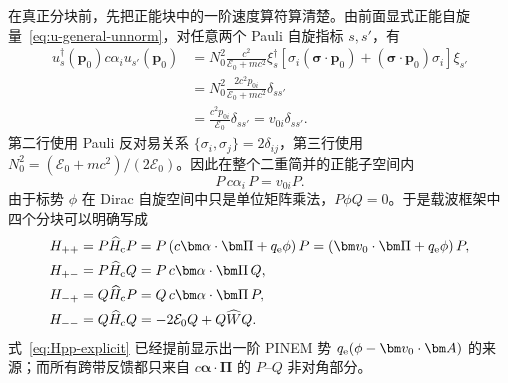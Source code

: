 在真正分块前，先把正能块中的一阶速度算符算清楚。由前面显式正能自旋量~\eqref{eq:u-general-unnorm}，对任意两个 Pauli 自旋指标 $s,s'$，有
\begin{align}
 u_s^\dagger(\bm p_0)c\alpha_i u_{s'}(\bm p_0)
 &=N_0^2\frac{c^2}{\mathcal E_0+mc^2}
 \xi_s^\dagger
 \left[\sigma_i(\bm\sigma\cdot\bm p_0)
 +(\bm\sigma\cdot\bm p_0)\sigma_i\right]\xi_{s'}\\
 &=N_0^2\frac{2c^2p_{0i}}{\mathcal E_0+mc^2}
 \delta_{ss'}\\
 &=\frac{c^2p_{0i}}{\mathcal E_0}\delta_{ss'}
 =v_{0i}\delta_{ss'}.
\label{eq:projected-alpha-velocity-explicit}
\end{align}
第二行使用 Pauli 反对易关系
$\{\sigma_i,\sigma_j\}=2\delta_{ij}$，第三行使用
$N_0^2=(\mathcal E_0+mc^2)/(2\mathcal E_0)$。因此在整个二重简并的正能子空间内
\begin{equation}
\boxed{P\,c\alpha_i\,P=v_{0i}P.}
\label{eq:projected-alpha-velocity}
\end{equation}
由于标势 $\phi$ 在 Dirac 自旋空间中只是单位矩阵乘法，$P\phi Q=0$。于是载波框架中四个分块可以明确写成
\begin{align}
H_{++}&=P\widehat H_{\rm c}P
=P\left(c\bm\alpha\cdot\bm\Pi+q_{\rm e}\phi\right)P
=\left(\bm v_0\cdot\bm\Pi+q_{\rm e}\phi\right)P,
\label{eq:Hpp-explicit}\\
H_{+-}&=P\widehat H_{\rm c}Q
=P\,c\bm\alpha\cdot\bm\Pi\,Q,
\label{eq:Hpq-explicit}\\
H_{-+}&=Q\widehat H_{\rm c}P
=Q\,c\bm\alpha\cdot\bm\Pi\,P,
\label{eq:Hqp-explicit}\\
H_{--}&=Q\widehat H_{\rm c}Q
=-2\mathcal E_0Q+Q\widehat WQ.
\label{eq:Hqq-explicit}
\end{align}
式~\eqref{eq:Hpp-explicit} 已经提前显示出一阶 PINEM 势
$q_{\rm e}(\phi-\bm v_0\cdot\bm A)$ 的来源；而所有跨带反馈都只来自 $c\bm\alpha\cdot\bm\Pi$ 的 $P$--$Q$ 非对角部分。

